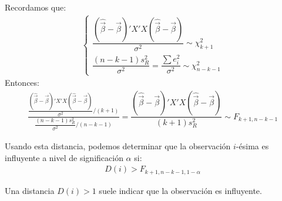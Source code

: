 \begin{obs}
    Recordamos que:
    \begin{align*}
        \begin{cases}
            \dfrac{(\widehat{\vec{\beta}}-\vec{\beta})'X'X(\widehat{\vec{\beta}}-\vec{\beta})}{\sigma^2} \sim \chi^2_{k+1} \\
            \dfrac{(n-k-1)s_R^2}{\sigma^2} = \dfrac{\sum e_i^2}{\sigma^2} \sim \chi^2_{n-k-1}
        \end{cases}
    \end{align*}
    Entonces:
    \begin{align*}
        \frac{\dfrac{(\widehat{\vec{\beta}}-\vec{\beta})'X'X(\widehat{\vec{\beta}}-\vec{\beta})}{\sigma^2} / (k+1)}{\dfrac{(n-k-1)s_R^2}{\sigma^2} / (n-k-1)} = \dfrac{(\widehat{\vec{\beta}}-\vec{\beta})'X'X(\widehat{\vec{\beta}}-\vec{\beta})}{(k+1)s_R^2} \sim F_{k+1, n-k-1}
    \end{align*}
\end{obs}
Usando esta distancia, podemos determinar que la observación $i$-ésima es influyente a nivel de significación $\alpha$ si:
\begin{align*}
    D(i) > F_{k+1, n-k-1, 1-\alpha}
\end{align*}

\begin{obs}
    Una distancia $D(i) > 1$ suele indicar que la observación es influyente.
\end{obs}

